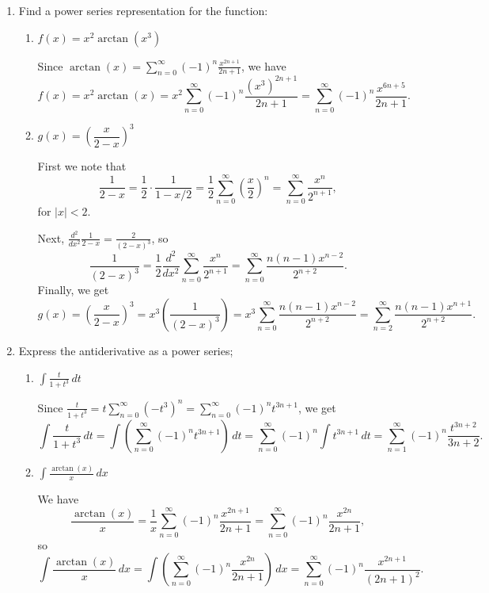 \documentclass[12pt]{article}
\newcommand{\di}{\displaystyle}
\newcommand{\abs}[1]{\left\lvert #1\right\rvert}
\begin{document}
\begin{enumerate}
\item Find a power series representation for the function:
\begin{enumerate}
\item $f(x) = x^2\arctan(x^3)$

Since $\arctan(x) = \sum_{n=0}^\infty (-1)^n\frac{x^{2n+1}}{2n+1}$, we have
\[
f(x)=x^2\arctan(x) = x^2\sum_{n=0}^\infty (-1)^n\frac{(x^3)^{2n+1}}{2n+1} = \sum_{n=0}^\infty (-1)^n\frac{x^{6n+5}}{2n+1}.
\]

\item $g(x) = \left(\dfrac{x}{2-x}\right)^3$

First we note that
\[
\frac{1}{2-x} = \frac12\cdot \frac{1}{1-x/2} = \frac12 \sum_{n=0}^\infty \left(\frac{x}{2}\right)^n = \sum_{n=0}^\infty\frac{x^n}{2^{n+1}},
\]
for $\abs{x}<2$. 

Next, $\frac{d^2}{dx^2}\frac{1}{2-x} = \frac{2}{(2-x)^3}$, so
\[
\frac{1}{(2-x)^3} = \frac{1}{2}\frac{d^2}{dx^2}\sum_{n=0}^\infty \frac{x^n}{2^{n+1}}= \sum_{n=0}^\infty\frac{n(n-1)x^{n-2}}{2^{n+2}}.
\]
Finally, we get
\[
g(x) = \left(\dfrac{x}{2-x}\right)^3 = x^3\left(\frac{1}{(2-x)^3}\right) = x^3\sum_{n=0}^\infty\frac{n(n-1)x^{n-2}}{2^{n+2}} = \sum_{n=2}^\infty \frac{n(n-1)x^{n+1}}{2^{n+2}}.
\]
\end{enumerate}


\item Express the antiderivative as a power series;
\begin{enumerate}
\item $\di\int\frac{t}{1+t^3}\,dt$

Since $\di \frac{t}{1+t^3} = t\sum_{n=0}^\infty (-t^3)^n = \sum_{n=0}^\infty (-1)^n t^{3n+1}$, we get
\[
\int\frac{t}{1+t^3}\,dt = \int\left(\sum_{n=0}^\infty (-1)^n t^{3n+1}\right)\,dt = \sum_{n=0}^\infty (-1)^n\int t^{3n+1} \,dt = \sum_{n=1}^\infty (-1)^n\frac{t^{3n+2}}{3n+2}.
\]

\item $\di \int \frac{\arctan(x)}{x}\,dx$

We have 
\[
\frac{\arctan(x)}{x} = \frac{1}{x}\sum_{n=0}^\infty(-1)^n\frac{x^{2n+1}}{2n+1} = \sum_{n=0}^\infty(-1)^n\frac{x^{2n}}{2n+1},
\]
so
\[
\int\frac{\arctan(x)}{x}\,dx = \int\left(\sum_{n=0}^\infty (-1)^n\frac{x^{2n}}{2n+1}\right)\,dx = \sum_{n=0}^\infty(-1)^n\frac{x^{2n+1}}{(2n+1)^2}.
\]
\end{enumerate}
\end{enumerate}
\end{document}
